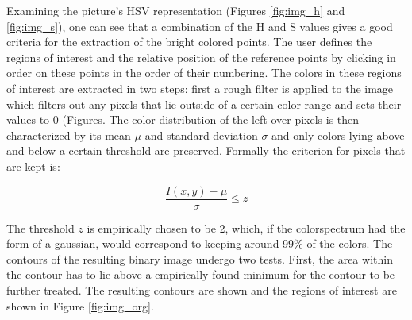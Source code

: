 Examining the picture's HSV representation (Figures \ref{fig:img_h} and \ref{fig:img_s}), one can see that a combination of the H and S values gives a good criteria for the extraction of the bright colored points. 
The user defines the regions of interest and the relative position of the reference points by clicking in order on these points in the order of their numbering.
The colors in these regions of interest are extracted in two steps: first a rough filter is applied to the image which filters out any pixels that lie outside of a certain color range and sets their values to 0 (Figures. 
The color distribution of the left over pixels is then characterized by its mean $\mu$ and standard deviation $\sigma$ and only colors lying above and below a certain threshold are preserved. Formally the criterion for pixels that are kept is:

\begin{equation}
    \frac{I(x,y)-\mu}{\sigma}\leq z
\end{equation}

The threshold $z$ is empirically chosen to be 2, which, if the colorspectrum had the form of a gaussian, would correspond to keeping around 99\% of the colors.
The contours of the resulting binary image undergo two tests. 
First, the area within the contour has to lie above a empirically found minimum for the contour to be further treated. The resulting contours are shown and the regions of interest are shown in Figure \ref{fig:img_org}. 

